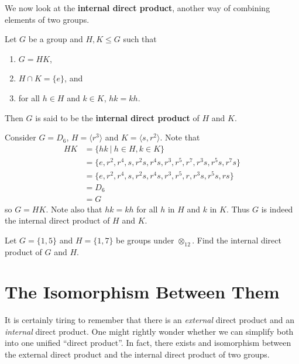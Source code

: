 We now look at the \textbf{internal direct product}, another way of combining elements of two groups.

\begin{definition}
    Let $G$ be a group and $H, K \leq G$ such that
    \begin{enumerate}
        \item $G = HK$,
        \item $H \cap K = \{e\}$, and
        \item for all $h \in H$ and $k \in K$, $hk = kh$.
    \end{enumerate}
    Then $G$ is said to be the \textbf{internal direct product} of $H$ and $K$.
\end{definition}

\begin{example}
    Consider $G = D_6$, $H = \langle r^3 \rangle$ and $K = \langle s, r^2 \rangle$. Note that
    \begin{align*}
        HK &= \{hk \ | \ h \in H, k \in K\}\\
        &= \{e, r^2, r^4, s, r^2s, r^4s, r^3, r^5, r^7, r^3s, r^5s, r^7s\}\\
        &= \{e, r^2, r^4, s, r^2s, r^4s, r^3, r^5, r, r^3s, r^5s, rs\}\\
        &= D_6\\
        &= G
    \end{align*}
    so $G = HK$. Note also that $hk = kh$ for all $h$ in $H$ and $k$ in $K$. Thus $G$ is indeed the internal direct product of $H$ and $K$.
\end{example}

\begin{exercise}
    Let $G = \{1, 5\}$ and $H = \{1, 7\}$ be groups under $\otimes_{12}$. Find the internal direct product of $G$ and $H$.
\end{exercise}

\section{The Isomorphism Between Them}
It is certainly tiring to remember that there is an \textit{external} direct product and an \textit{internal} direct product. One might rightly wonder whether we can simplify both into one unified ``direct product''. In fact, there exists and isomorphism between the external direct product and the internal direct product of two groups.

